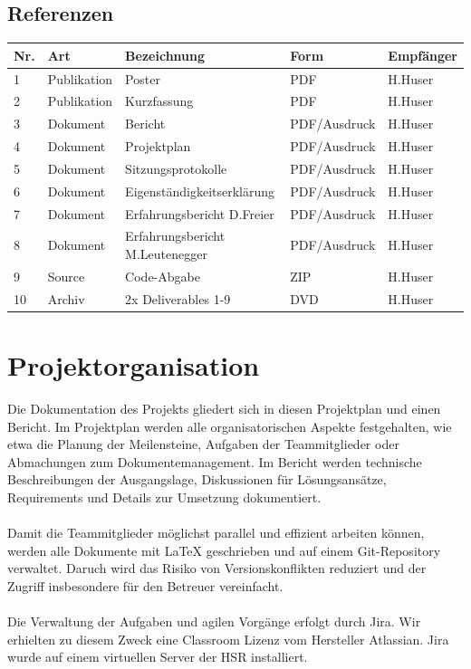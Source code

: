 	\subsection*{Referenzen}
		\begin{tabularx}{\textwidth}{llXll}
			\textbf{Nr.}	& \textbf{Art} & \textbf{Bezeichnung} & \textbf{Form} & \textbf{Empfänger}
			\\ \hline
				1 &
				Publikation &
				Poster &
				PDF &
				H.Huser
			\\ \hline
				2 &
				Publikation &
				Kurzfassung &
				PDF &
				H.Huser
			\\ \hline
				3 &
				Dokument	 &
				Bericht &
				PDF/Ausdruck	 &
				H.Huser
			\\ \hline
				4 &
				Dokument	 &
				Projektplan &
				PDF/Ausdruck &
				H.Huser
			\\	\hline
				5 &
				Dokument	 &
				Sitzungsprotokolle &
				PDF/Ausdruck &
				H.Huser
			\\ \hline
				6 &
				Dokument &
				Eigenständigkeitserklärung &
				PDF/Ausdruck	 &
				H.Huser
			\\ \hline
				7 &
				Dokument &
				Erfahrungsbericht D.Freier &
				PDF/Ausdruck &
				H.Huser
			\\ \hline
				8 &
				Dokument &
				Erfahrungsbericht M.Leutenegger &
				PDF/Ausdruck &
				H.Huser
			\\ \hline
				9 &
				Source &
				Code-Abgabe &
				ZIP &
				H.Huser
			\\ \hline
				10 &
				Archiv &
				2x Deliverables 1-9 &
				DVD &
				H.Huser
			\\ \hline
		\end{tabularx}
\pagebreak


\section*{Projektorganisation}
	Die Dokumentation des Projekts gliedert sich in diesen Projektplan und einen Bericht. Im 
	Projektplan werden alle organisatorischen Aspekte festgehalten, wie etwa die Planung der 
	Meilensteine, Aufgaben der Teammitglieder oder Abmachungen zum Dokumentemanagement. Im 
	Bericht werden technische Beschreibungen der Ausgangslage, Diskussionen für Lösungsansätze, 
	Requirements und Details zur Umsetzung dokumentiert.
	\\ \\
	Damit die Teammitglieder möglichst parallel und effizient arbeiten können, werden alle Dokumente 
	mit LaTeX geschrieben und auf einem Git-Repository verwaltet. Daruch wird das Risiko von Versionskonflikten 
	reduziert und der Zugriff insbesondere für den Betreuer vereinfacht.
	\\ \\
	Die Verwaltung der Aufgaben und agilen Vorgänge erfolgt durch Jira. Wir erhielten zu diesem Zweck eine 
	Classroom Lizenz vom Hersteller Atlassian. Jira wurde auf einem virtuellen Server der HSR installiert.


